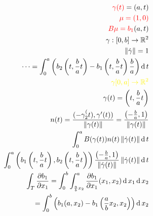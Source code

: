 \begin{Bew}
\begin{eqnarray*}
    {\color{red}\gamma(t)}=(a,t)\\
    {\color{red}\mu=(1,0)}\\
    {\color{red}B\mu=b_1}(a,t)\\
    \gamma:[0,b]\to\mb{R}^2\\
    \Norm{\dot\gamma}=1\\
    \cdots = \int_0^a\left( b_2\left( t,\frac{b}{a}t \right)-b_1\left( t,\frac{b}{a}t \right)\frac{b}{a} \right)\md t\\
    {\color{yellow} \gamma[0,a]\to\mb{R}^2}\\
    \gamma(t)=\left( t,\frac{b}{a}t\right)\\
    n(t)=\frac{(-\gamma_2^(t),\gamma'(t))}{\Norm{\gamma(t)}}=\frac{\left( -\frac{b}{a}, 1 \right)}{\Norm{\gamma(t)}}\\
    \int_0^aB(\gamma(t))n(t)\Norm{\dot\gamma(t)}\md t\\
    \int_0^a\left( b_1\left( t,\frac{b}{a}t \right), b_2\left( t,\frac{b}{a}t \right) \right)\frac{\left( -\frac{b}{a},1 \right)}{\Norm{\dot\gamma(t)}}\Norm{\dot\gamma(t)}\md t\\
    \int_T\Part{b_1}{x_1}=\int_0^b\int_{\frac{a}{b}x_2}^a\Part{b_1}{x_1}(x_1,x_2)\md x_1\md x_2\\
    =\int_0^b\left( b_1(a,x_2)-b_1\left( \frac{a}{b}x_2,x_2 \right) \right)\md x_2
  \end{eqnarray*}
\end{Bew}
